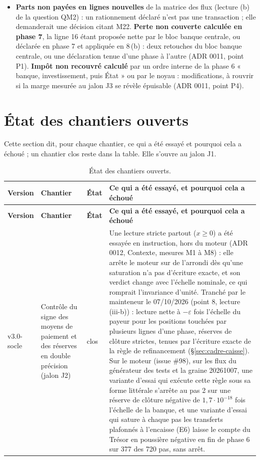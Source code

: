 \documentclass[11pt,a4paper]{article}
\begin{document}
\begin{itemize}
\item \textbf{Parts non payées en lignes nouvelles} de la matrice des flux (lecture (b) de la question QM2) : un rationnement déclaré n'est pas une transaction ; elle demanderait une décision citant M22. \textbf{Perte non couverte calculée en phase 7}, la ligne 16 étant proposée nette par le bloc banque centrale, ou déclarée en phase 7 et appliquée en 8\,(b) : deux retouches du bloc banque centrale, ou une déclaration tenue d'une phase à l'autre (ADR 0011, point P1). \textbf{Impôt non recouvré calculé} par un ordre interne de la phase 6 « banque, investissement, puis État » ou par le noyau : modifications, à rouvrir si la marge mesurée au jalon J3 se révèle épuisable (ADR 0011, point P4).
\end{itemize}

\section{État des chantiers ouverts}
\label{sec:chantiers}
Cette section dit, pour chaque chantier, ce qui a été essayé et pourquoi cela a échoué ; un chantier clos reste dans la table. Elle s'ouvre au jalon J1.

\begin{center}\small
\begin{longtable}{p{1.6cm}p{4.4cm}p{1.6cm}p{7.0cm}}
\caption{État des chantiers ouverts.}\label{tab:chantiers}\\
\toprule
\textbf{Version} & \textbf{Chantier} & \textbf{État} & \textbf{Ce qui a été essayé, et pourquoi cela a échoué}\\
\midrule
\endfirsthead
\toprule
\textbf{Version} & \textbf{Chantier} & \textbf{État} & \textbf{Ce qui a été essayé, et pourquoi cela a échoué}\\
\midrule
\endhead
v3.0-socle & Contrôle du signe des moyens de paiement et des réserves en double précision (jalon J2) & clos & Une lecture stricte partout ($x \ge 0$) a été essayée en instruction, hors du moteur (ADR 0012, Contexte, mesures M1 à M8) : elle arrête le moteur sur de l'arrondi dès qu'une saturation n'a pas d'écriture exacte, et son verdict change avec l'échelle nominale, ce qui romprait l'invariance d'unité. Tranché par le mainteneur le 07/10/2026 (point 8, lecture (iii-b)) : lecture nette à $-\varepsilon$ fois l'échelle du payeur pour les positions touchées par plusieurs lignes d'une phase, réserves de clôture strictes, tenues par l'écriture exacte de la règle de refinancement (\S\ref{sec:cadre-caisse}). Sur le moteur (issue \#98), sur les flux du générateur des tests et la graine 20261007, une variante d'essai qui exécute cette règle sous sa forme littérale s'arrête au pas 2 sur une réserve de clôture négative de $1{,}7 \cdot 10^{-18}$ fois l'échelle de la banque, et une variante d'essai qui sature à chaque pas les transferts plafonnés à l'encaisse (E6) laisse le compte du Trésor en poussière négative en fin de phase 6 sur 377 des 720 pas, sans arrêt.\\
\bottomrule
\end{longtable}
\end{center}
\end{document}
